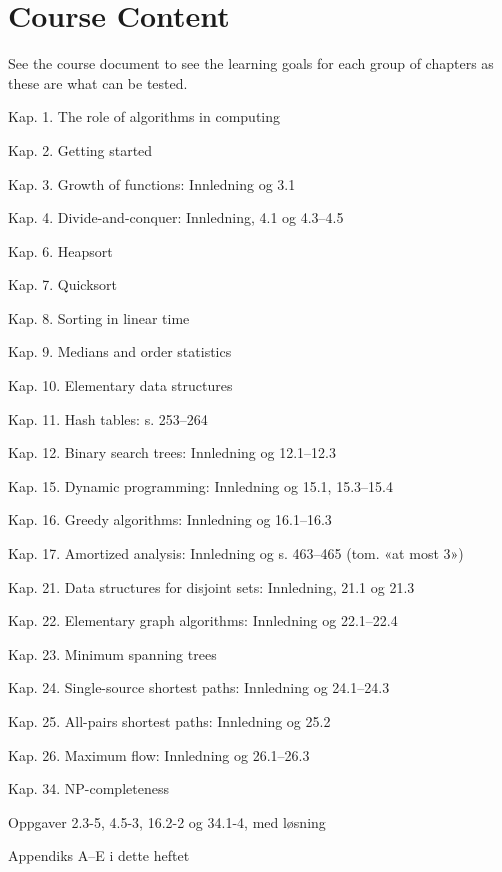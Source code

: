 \section{Course Content}
See the course document to see the learning goals for each group of chapters as these are what can be tested. 
\begin{todolist}
    \item Kap. 1.  The role of algorithms in computing
    \item Kap. 2.  Getting started
    \item Kap. 3.  Growth of functions: Innledning og 3.1
    \item Kap. 4.  Divide-and-conquer: Innledning, 4.1 og 4.3–4.5
    \item Kap. 6.  Heapsort
    \item Kap. 7.  Quicksort
    \item Kap. 8.  Sorting in linear time
    \item Kap. 9.  Medians and order statistics
    \item Kap. 10. Elementary data structures
    \item Kap. 11. Hash tables: s. 253–264
    \item Kap. 12. Binary search trees: Innledning og 12.1–12.3
    \item Kap. 15. Dynamic programming: Innledning og 15.1, 15.3–15.4
    \item Kap. 16. Greedy algorithms: Innledning og 16.1–16.3
    \item Kap. 17. Amortized analysis: Innledning og s. 463–465 (tom. «at most 3»)
    \item Kap. 21. Data structures for disjoint sets: Innledning, 21.1 og 21.3
    \item Kap. 22. Elementary graph algorithms: Innledning og 22.1–22.4
    \item Kap. 23. Minimum spanning trees
    \item Kap. 24. Single-source shortest paths: Innledning og 24.1–24.3
    \item Kap. 25. All-pairs shortest paths: Innledning og 25.2
    \item Kap. 26. Maximum flow: Innledning og 26.1–26.3
    \item Kap. 34. NP-completeness
    \item Oppgaver 2.3-5, 4.5-3, 16.2-2 og 34.1-4, med løsning
    \item Appendiks A–E i dette heftet
\end{todolist}